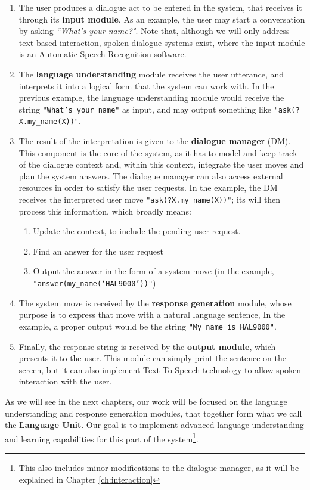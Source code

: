  \begin{enumerate}
	\item The user produces a dialogue act to be entered in the system, that receives it through its \textbf{input module}. As an example, the user may start a conversation by asking \textit{``What's your name?"}. Note that, although we will only address text-based interaction, spoken dialogue systems exist, where the input module is an Automatic Speech Recognition software.
	\item The \textbf{language understanding} module receives the user utterance, and interprets it into a logical form that the system can work with. In the previous example, the language understanding module would receive the string \texttt{"What's your name"} as input, and may output something like \texttt{"ask(?X.my\_name(X))"}.
	\item The result of the interpretation is given to the \textbf{dialogue manager} (DM). This component is the core of the system, as it has to model and keep track of the dialogue context and, within this context, integrate the user moves and plan the system answers. The dialogue manager can also access external resources in order to satisfy the user requests. In the example, the DM receives the interpreted user move \texttt{"ask(?X.my\_name(X))"}; its will then process this information, which broadly means:
	\begin{enumerate}
		\item Update the context, to include the pending user request.
		\item Find an answer for the user request
		\item Output the answer in the form of a system move (in the example, \\ \texttt{"answer(my\_name(`HAL9000'))"})
	\end{enumerate}
	\item The system move is received by the \textbf{response generation} module, whose purpose is to express that move with a natural language sentence, In the example, a proper output would be the string \texttt{"My name is HAL9000"}.
	\item Finally, the response string is received by the \textbf{output module}, which presents it to the user. This module can simply print the sentence on the screen, but it can also implement Text-To-Speech technology to allow spoken interaction with the user.
\end{enumerate}

As we will see in the next chapters, our work will be focused on the language understanding and response generation modules, that together form what we call the \textbf{Language Unit}. Our goal is to implement advanced language understanding and learning capabilities for this part of the system\footnote{This also includes minor modifications to the dialogue manager, as it will be explained in Chapter \ref{ch:interaction}}. 
 
